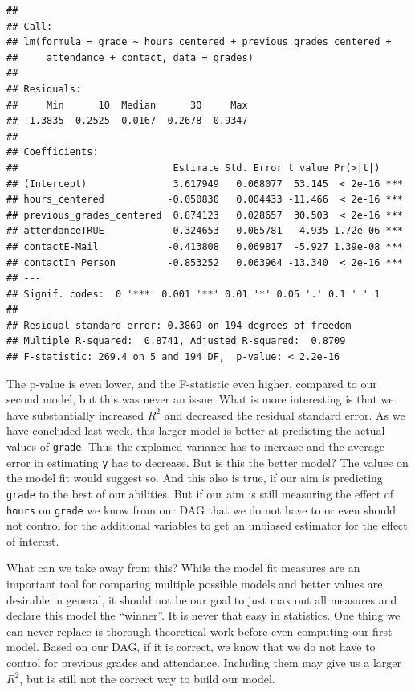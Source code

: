\documentclass[
]{book}
\begin{document}
\begin{verbatim}
## 
## Call:
## lm(formula = grade ~ hours_centered + previous_grades_centered + 
##     attendance + contact, data = grades)
## 
## Residuals:
##     Min      1Q  Median      3Q     Max 
## -1.3835 -0.2525  0.0167  0.2678  0.9347 
## 
## Coefficients:
##                           Estimate Std. Error t value Pr(>|t|)    
## (Intercept)               3.617949   0.068077  53.145  < 2e-16 ***
## hours_centered           -0.050830   0.004433 -11.466  < 2e-16 ***
## previous_grades_centered  0.874123   0.028657  30.503  < 2e-16 ***
## attendanceTRUE           -0.324653   0.065781  -4.935 1.72e-06 ***
## contactE-Mail            -0.413808   0.069817  -5.927 1.39e-08 ***
## contactIn Person         -0.853252   0.063964 -13.340  < 2e-16 ***
## ---
## Signif. codes:  0 '***' 0.001 '**' 0.01 '*' 0.05 '.' 0.1 ' ' 1
## 
## Residual standard error: 0.3869 on 194 degrees of freedom
## Multiple R-squared:  0.8741, Adjusted R-squared:  0.8709 
## F-statistic: 269.4 on 5 and 194 DF,  p-value: < 2.2e-16
\end{verbatim}

The p-value is even lower, and the F-statistic even higher, compared to our second model, but this was never an issue. What is more interesting is that we have substantially increased \(R^2\) and decreased the residual standard error. As we have concluded last week, this larger model is better at predicting the actual values of \texttt{grade}. Thus the explained variance has to increase and the average error in estimating \texttt{y} has to decrease. But is this the better model? The values on the model fit would suggest so. And this also is true, if our aim is predicting \texttt{grade} to the best of our abilities. But if our aim is still measuring the effect of \texttt{hours} on \texttt{grade} we know from our DAG that we do not have to or even should not control for the additional variables to get an unbiased estimator for the effect of interest.

What can we take away from this? While the model fit measures are an important tool for comparing multiple possible models and better values are desirable in general, it should not be our goal to just max out all measures and declare this model the ``winner''. It is never that easy in statistics. One thing we can never replace is thorough theoretical work before even computing our first model. Based on our DAG, if it is correct, we know that we do not have to control for previous grades and attendance. Including them may give us a larger \(R^2\), but is still not the correct way to build our model.
\end{document}
